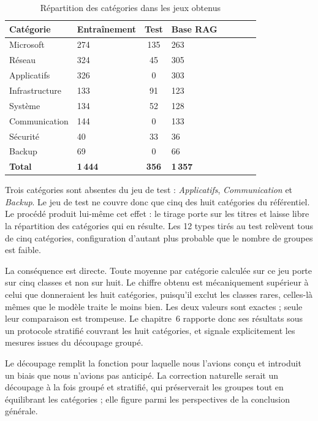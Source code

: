 \begin{table}[!htbp]
\centering
\styletableau
\caption{Répartition des catégories dans les jeux obtenus}
\label{tab:splits}
\begin{tabular}{|Bp{3.4cm}|Cp{2.9cm}|Cp{2.2cm}|Cp{2.4cm}|}
\hline
{}
\textbf{Catégorie} & \textbf{Entraînement} & \textbf{Test} & \textbf{Base RAG} \\
\hline
Microsoft & 274 & 135 & 263 \\
\hline
Réseau & 324 & 45 & 305 \\
\hline
Applicatifs & 326 & 0 & 303 \\
\hline
Infrastructure & 133 & 91 & 123 \\
\hline
Système & 134 & 52 & 128 \\
\hline
Communication & 144 & 0 & 133 \\
\hline
Sécurité & 40 & 33 & 36 \\
\hline
Backup & 69 & 0 & 66 \\
\hline
{}
\textbf{Total} & \textbf{1\,444} & \textbf{356} & \textbf{1\,357} \\
\hline
\end{tabular}
\end{table}

Trois catégories sont absentes du jeu de test : \emph{Applicatifs}, \emph{Communication} et
\emph{Backup}. Le jeu de test ne couvre donc que cinq des huit catégories du référentiel. Le procédé
produit lui-même cet effet : le tirage porte sur les titres et laisse libre la répartition des
catégories qui en résulte. Les 12 types tirés au test relèvent tous de cinq catégories,
configuration d'autant plus probable que le nombre de groupes est faible.

La conséquence est directe. Toute moyenne par catégorie calculée sur ce jeu porte sur cinq classes
et non sur huit. Le chiffre obtenu est mécaniquement supérieur à celui que donneraient les huit
catégories, puisqu'il exclut les classes rares, celles-là mêmes que le modèle traite le moins bien.
Les deux valeurs sont exactes ; seule leur comparaison est trompeuse. Le chapitre~6 rapporte donc ses résultats sous un protocole stratifié couvrant les huit catégories, et signale explicitement les
mesures issues du découpage groupé.

Le découpage remplit la fonction pour laquelle nous l'avions conçu et introduit un biais que nous
n'avions pas anticipé. La correction naturelle serait un découpage à la fois groupé et stratifié,
qui préserverait les groupes tout en équilibrant les catégories ; elle figure parmi les perspectives
de la conclusion générale.

